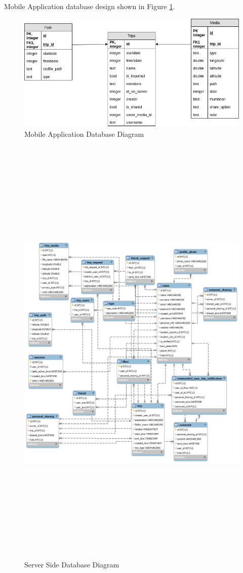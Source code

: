 Mobile Application database design shown in Figure \ref{fig:mobileApplicationDatabaseDiagram}.
\begin{figure}[!htbp]
\centering
\includegraphics[width=\textwidth]{projectChapters/images/android_database.png}
\caption{Mobile Application Database Diagram}
\label{fig:mobileApplicationDatabaseDiagram}
\end{figure}

\begin{figure}[!htbp]
\centering
\includegraphics[width=40em, height=58em]{projectChapters/images/databaseDesign.png}
\caption{Server Side Database Diagram}
\label{fig:serverDatabase}
\end{figure}

